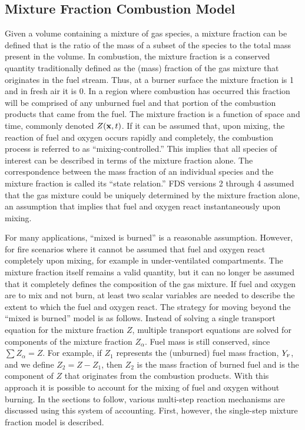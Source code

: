 \documentclass[11pt]{book}
\begin{document}
\subsection{Mixture Fraction Combustion Model}

Given a volume containing a mixture of gas species, a mixture fraction can be defined that
is the ratio of the mass of a subset of the species to the total mass present in the volume.
In combustion, the mixture fraction is a conserved quantity traditionally defined as the (mass) fraction of the
gas mixture that originates in
the fuel stream. Thus, at a burner surface the mixture fraction is 1 and in fresh air it is 0.
In a region where combustion has occurred this fraction will be comprised of any unburned fuel and
that portion of the combustion products that came from the fuel.
The mixture fraction is a function of space and time, commonly denoted $Z({\bf x},t)$.
If it can be assumed that, upon mixing, the reaction of fuel and oxygen occurs rapidly and completely,
the combustion process is referred to as ``mixing-controlled.'' This implies that all species of
interest can be described in terms of the mixture fraction alone.
The correspondence between the
mass fraction of an individual species and the mixture fraction is called its ``state relation.''
FDS versions 2 through 4 assumed that the gas mixture could be uniquely determined by the mixture fraction alone,
an assumption that implies that fuel and oxygen react instantaneously upon mixing.

For many applications, ``mixed is burned'' is a reasonable
assumption. However, for fire scenarios where it cannot be assumed
that fuel and oxygen react completely upon mixing, for example in
under-ventilated compartments. The mixture fraction itself remains a
valid quantity, but it can no longer be assumed that it completely
defines the composition of the gas mixture. If fuel and oxygen are to
mix and not burn, at least two scalar variables are needed to describe
the extent to which the fuel and oxygen react.  The strategy for
moving beyond the ``mixed is burned'' model is as follows. Instead of
solving a single transport equation for the mixture fraction $Z$,
multiple transport equations are solved for components of the mixture
fraction $Z_\alpha$. Fuel mass is still conserved, since $\sum
Z_\alpha=Z$. For example, if $Z_1$ represents the (unburned) fuel mass
fraction, $Y_{\tiny \hbox{F}}$, and we define $Z_2 = Z-Z_1$, then $Z_2$ is the mass
fraction of burned fuel and is the component of $Z$ that originates
from the combustion products.  With this approach it is possible to
account for the mixing of fuel and oxygen without burning. In the
sections to follow, various multi-step reaction mechanisms are
discussed using this system of accounting. First, however, the
single-step mixture fraction model is described.
\end{document}
